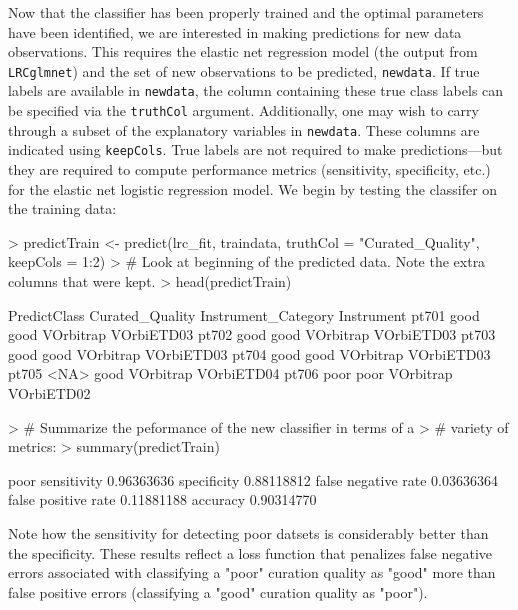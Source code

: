 \documentclass{article}
\begin{document}
Now that the classifier has been properly trained and the optimal parameters have been identified, we are 
interested in making predictions for new data observations. This requires the elastic net regression model 
(the output from {\tt LRCglmnet}) and the set of new observations to be predicted, {\tt newdata}.  If true labels 
are available in {\tt newdata}, the column containing these true class labels can be specified via the 
{\tt truthCol} argument. Additionally, one may wish to carry through a subset of the explanatory variables in 
{\tt newdata}.  These columns are indicated using {\tt keepCols}.   True labels are not required to make 
predictions---but they are required to compute performance metrics (sensitivity, specificity, etc.) for the 
elastic net logistic regression model. We begin by testing the classifer on the training data:
\begin{Schunk}
\begin{Sinput}
> predictTrain <- predict(lrc_fit, traindata, truthCol = "Curated_Quality", keepCols = 1:2)
> # Look at beginning of the predicted data.  Note the extra columns that were kept.
> head(predictTrain)
\end{Sinput}
\begin{Soutput}
      PredictClass Curated_Quality Instrument_Category Instrument
pt701         good            good           VOrbitrap VOrbiETD03
pt702         good            good           VOrbitrap VOrbiETD03
pt703         good            good           VOrbitrap VOrbiETD03
pt704         good            good           VOrbitrap VOrbiETD03
pt705         <NA>            good           VOrbitrap VOrbiETD04
pt706         poor            poor           VOrbitrap VOrbiETD02
\end{Soutput}
\begin{Sinput}
> # Summarize the peformance of the new classifier in terms of a 
> # variety of metrics:
> summary(predictTrain)
\end{Sinput}
\begin{Soutput}
                          poor
sensitivity         0.96363636
specificity         0.88118812
false negative rate 0.03636364
false positive rate 0.11881188
accuracy            0.90314770
\end{Soutput}
\end{Schunk}
\noindent Note how the sensitivity for detecting poor datsets is considerably better than the specificity. 
These results reflect a loss function that penalizes false negative errors associated with classifying a 
"poor" curation quality as "good" more than false positive errors (classifying a "good" curation quality 
as "poor"). 
\end{document}
